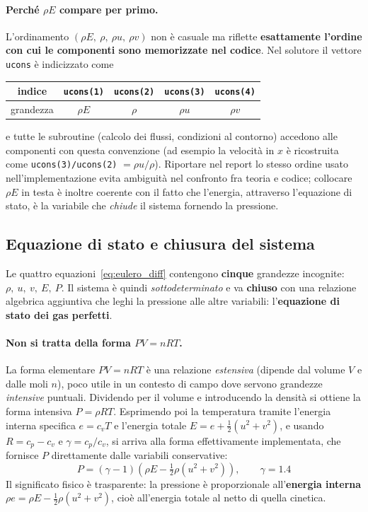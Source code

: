 \paragraph{Perché $\rho E$ compare per primo.}
L'ordinamento $(\rho E,\ \rho,\ \rho u,\ \rho v)$ non è casuale ma riflette
\textbf{esattamente l'ordine con cui le componenti sono memorizzate nel codice}.
Nel solutore il vettore \texttt{ucons} è indicizzato come
\begin{center}
\begin{tabular}{ccccc}
\toprule
indice & \texttt{ucons(1)} & \texttt{ucons(2)} & \texttt{ucons(3)} & \texttt{ucons(4)} \\
\midrule
grandezza & $\rho E$ & $\rho$ & $\rho u$ & $\rho v$ \\
\bottomrule
\end{tabular}
\end{center}
e tutte le subroutine (calcolo dei flussi, condizioni al contorno) accedono alle
componenti con questa convenzione (ad esempio la velocità in $x$ è ricostruita come
\texttt{ucons(3)/ucons(2)} $=\rho u/\rho$).
Riportare nel report lo stesso ordine usato nell'implementazione evita ambiguità nel
confronto fra teoria e codice; collocare $\rho E$ in testa è inoltre coerente con il
fatto che l'energia, attraverso l'equazione di stato, è la variabile che \emph{chiude}
il sistema fornendo la pressione.

\subsection{Equazione di stato e chiusura del sistema}

Le quattro equazioni~\eqref{eq:eulero_diff} contengono \textbf{cinque} grandezze
incognite: $\rho,\ u,\ v,\ E,\ P$.
Il sistema è quindi \emph{sottodeterminato} e va \textbf{chiuso} con una relazione
algebrica aggiuntiva che leghi la pressione alle altre variabili: l'\textbf{equazione
di stato dei gas perfetti}.

\paragraph{Non si tratta della forma $PV = nRT$.}
La forma elementare $PV = nRT$ è una relazione \emph{estensiva} (dipende dal volume $V$
e dalle moli $n$), poco utile in un contesto di campo dove servono grandezze
\emph{intensive} puntuali. Dividendo per il volume e introducendo la densità si ottiene
la forma intensiva $P = \rho R T$. Esprimendo poi la temperatura tramite l'energia
interna specifica $e = c_v T$ e l'energia totale $E = e + \tfrac{1}{2}(u^2+v^2)$, e
usando $R = c_p - c_v$ e $\gamma = c_p/c_v$, si arriva alla forma effettivamente
implementata, che fornisce $P$ direttamente dalle variabili conservative:
\begin{equation}
  P = (\gamma - 1)\left(\rho E - \tfrac{1}{2}\rho(u^2+v^2)\right), \qquad \gamma = 1.4
  \label{eq:stato}
\end{equation}
Il significato fisico è trasparente: la pressione è proporzionale all'\textbf{energia
interna} $\rho e = \rho E - \tfrac12\rho(u^2+v^2)$, cioè all'energia totale al netto di
quella cinetica.

